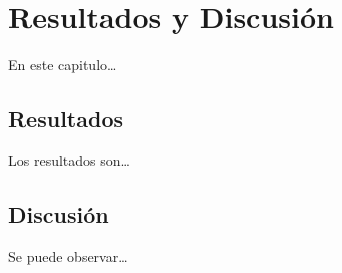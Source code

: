 \chapter{Resultados y Discusión}

En este capitulo\ldots{}

\section{Resultados}
\label{sec:org7755065}

Los resultados son\ldots{}

\section{Discusión}
\label{sec:org1cc59fb}

Se puede observar\ldots{}
